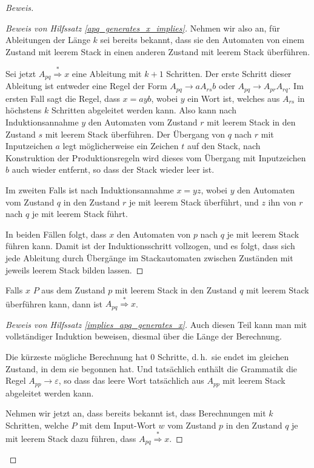 \begin{proof}[Beweis]
\begin{proof}[Beweis von Hilfssatz \ref{apq_generates_x_implies}]
Nehmen wir also an, für Ableitungen der Länge $k$ sei bereits
bekannt, dass sie den Automaten von einem Zustand mit leerem Stack
in einen anderen Zustand mit leerem Stack überführen.

Sei jetzt $A_{pq}\overset{*}{\Rightarrow}x$ eine Ableitung mit $k+1$
Schritten. Der erste Schritt dieser Ableitung ist entweder eine
Regel der Form $A_{pq}\to aA_{rs}b$ oder $A_{pq}\to A_{pr}A_{rq}$.
Im ersten Fall sagt die Regel, dass $x=ayb$, wobei $y$ ein
Wort ist, welches aus $A_{rs}$ in höchstens $k$ Schritten abgeleitet
werden kann. Also kann nach Induktionsannahme $y$ den Automaten vom
Zustand $r$ mit leerem Stack in den Zustand $s$ mit leerem Stack
überführen. Der Übergang von $q$ nach $r$ mit Inputzeichen $a$
legt möglicherweise ein Zeichen $t$ auf den Stack, nach Konstruktion
der Produktionsregeln wird dieses vom Übergang mit Inputzeichen $b$
auch wieder entfernt, so dass der Stack wieder leer ist.

Im zweiten Falls ist nach Induktionsannahme $x=yz$, wobei $y$ den
Automaten vom Zustand $q$ in den Zustand $r$ je mit leerem Stack
überführt, und $z$ ihn von $r$ nach $q$ je mit leerem Stack
führt.

In beiden Fällen folgt, dass $x$ den Automaten von $p$
nach $q$ je mit leerem Stack führen kann.
Damit ist der Induktionsschritt vollzogen, und es folgt, dass
sich jede Ableitung durch Übergänge im Stackautomaten zwischen
Zuständen mit jeweils leerem Stack bilden lassen.
\end{proof}

\begin{hilfssatz}\label{implies_apq_generates_x}
Falls $x$ $P$ aus dem Zustand $p$ mit leerem Stack in den Zustand
$q$ mit leerem Stack überführen kann, dann ist
$A_{pq}\overset{*}{\Rightarrow} x$.
\end{hilfssatz}

\begin{proof}[Beweis von Hilfssatz \ref{implies_apq_generates_x}]
Auch diesen Teil kann man mit vollständiger Induktion beweisen,
diesmal über die Länge der Berechnung. 

Die kürzeste mögliche Berechnung hat $0$ Schritte, d.\,h.~sie endet
im gleichen Zustand, in dem sie begonnen hat.
Und tatsächlich enthält die Grammatik die Regel $A_{pp}\to\varepsilon$, 
so dass das leere Wort tatsächlich aus $A_{pp}$ mit leerem
Stack abgeleitet werden kann.

Nehmen wir jetzt an, dass bereits bekannt ist, dass Berechnungen mit
$k$ Schritten, welche $P$ mit dem Input-Wort $w$ vom Zustand $p$
in den Zustand $q$ je mit leerem Stack dazu führen, dass
$A_{pq}\overset{*}{\Rightarrow} x$.


\end{proof}
\end{proof}
